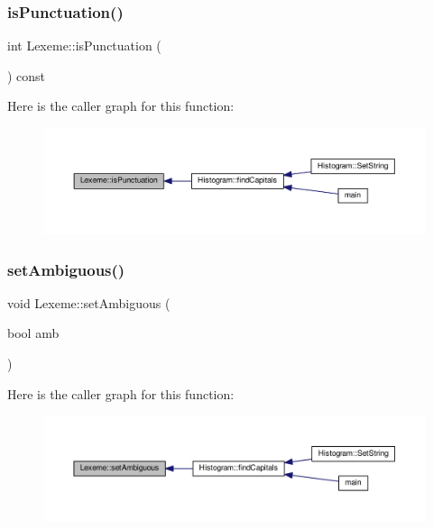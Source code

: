 \subsubsection{\texorpdfstring{is\+Punctuation()}{isPunctuation()}}
{\footnotesize\ttfamily int Lexeme\+::is\+Punctuation (\begin{DoxyParamCaption}{ }\end{DoxyParamCaption}) const\hspace{0.3cm}{\ttfamily [inline]}}

Here is the caller graph for this function\+:
\nopagebreak
\begin{figure}[H]
\begin{center}
\leavevmode
\includegraphics[width=350pt]{class_lexeme_a67fb5732247889cb97612dd327c7a194_icgraph}
\end{center}
\end{figure}
\mbox{\label{class_lexeme_a8fd310c078c13d53dc601c299d0acb78}} 
\subsubsection{\texorpdfstring{set\+Ambiguous()}{setAmbiguous()}}
{\footnotesize\ttfamily void Lexeme\+::set\+Ambiguous (\begin{DoxyParamCaption}\item[{bool}]{amb }\end{DoxyParamCaption})\hspace{0.3cm}{\ttfamily [inline]}}

Here is the caller graph for this function\+:
\nopagebreak
\begin{figure}[H]
\begin{center}
\leavevmode
\includegraphics[width=350pt]{class_lexeme_a8fd310c078c13d53dc601c299d0acb78_icgraph}
\end{center}
\end{figure}
\mbox{\label{class_lexeme_aa54d86594141f95df8a0364aebc931f2}} 
